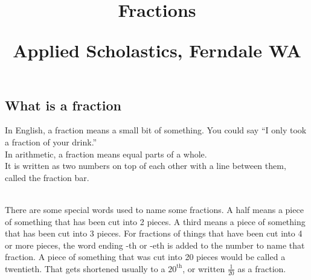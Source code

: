 \documentclass[16pt]{article}
\author{}
\date{}
\title{Fractions\\
\vspace{28pt}
\begin{normalsize}Applied Scholastics, Ferndale WA \end{normalsize}}
\begin{document}
\maketitle
\pagebreak
\tableofcontents
\pagebreak

\begin{spacing}{1.25}

\section{What is a fraction}

In English, a fraction means a small bit of something. You could say “I only took a fraction of your drink.”\\

In arithmetic, a fraction means  equal parts of a whole.\\

It is written as two numbers on top of each other with a line between them, called the fraction bar.\\

\\

There are some special words used to name some fractions. A half means a piece of something that has been cut into 2 pieces. A third means a piece of something that has been cut into 3 pieces. For fractions of things that have been cut into 4 or more pieces, the word ending -th or -eth is added to the number to name that fraction. A piece of something that was cut into 20 pieces would be called a twentieth. That gets shortened usually to a $20^{\textrm{th}}$, or written $\frac{1}{20}$ as a fraction.\\

\pagebreak


\end{spacing}
\end{document}
